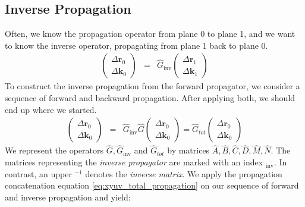 \documentclass[12pt,a4paper,twoside,openright,BCOR10mm,headsepline,titlepage,abstracton,chapterprefix,final]{scrreprt}
\newcommand\Vector[1]{{\mathbf{#1}}}
\newcommand\wavenumber{k}
\newcommand\Wavevector{\Vector{\wavenumber}}
\begin{document}
\subsection{Inverse Propagation}
Often, we know the propagation operator from plane 0 to plane 1, and we want to know the inverse operator,
propagating from plane 1 back to plane 0.
\begin{eqnarray}
 \begin{pmatrix}
  \Delta \Vector{r}_{0} \\ \Delta \Wavevector_{0}
 \end{pmatrix}
 &=&
 \hat{G}_{\text{inv}}
 \begin{pmatrix}
  \Delta \Vector{r}_{1} \\ \Delta \Wavevector_{1}
 \end{pmatrix}
\end{eqnarray}
To construct the inverse propagation from the forward propagator,
we consider a sequence of forward and backward propagation.
After applying both, we should end up where we started.
\begin{eqnarray}
 \begin{pmatrix}
  \Delta \Vector{r}_{0} \\ \Delta \Wavevector_{0}
 \end{pmatrix}
 &=&
 \hat{G}_{\text{inv}}
 \hat{G}
 \begin{pmatrix}
  \Delta \Vector{r}_{0} \\ \Delta \Wavevector_{0}
 \end{pmatrix}
 =  
 \hat{G}_{tot}
  \begin{pmatrix}
  \Delta \Vector{r}_{0} \\ \Delta \Wavevector_{0}
 \end{pmatrix}
\end{eqnarray}
We represent the operators $\hat{G}, \hat{G}_{\text{inv}}$ and $\hat{G}_{tot}$ by matrices $\hat{A},\hat{B},\hat{C},\hat{D},\hat{M},\hat{N}$.
The matrices representing the \emph{inverse propagator} are marked with an index $_\text{inv}$.
In contrast, an upper $^{-1}$ denotes the \emph{inverse matrix}.
We apply the propagation concatenation equation \eqref{eq:xyuv_total_propagation} on our sequence of forward and inverse propagation and yield:
\end{document}
